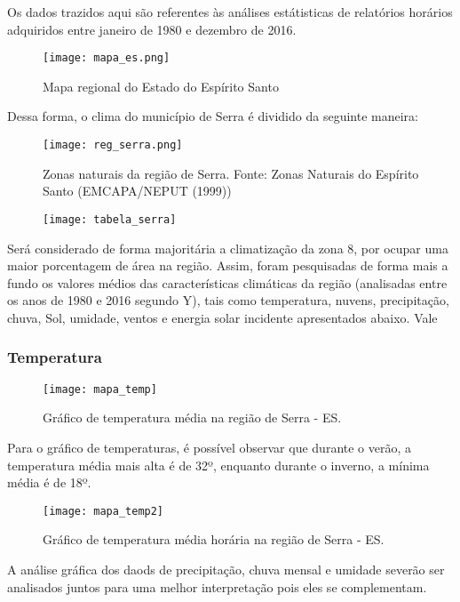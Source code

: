Os dados trazidos aqui são referentes às análises estátisticas de relatórios horários adquiridos entre janeiro de 1980 e dezembro de 2016. 


\begin{figure}[H]
	\texttt{[image: mapa\_es.png]}
	\centering
	\caption{Mapa regional do Estado do Espírito Santo}
	\label{mapa_es}
	
\end{figure}

Dessa forma, o clima do município de Serra é dividido da seguinte maneira:

\begin{figure}[!htb]
	\texttt{[image: reg\_serra.png]}
	\centering
	\caption{Zonas naturais da região de Serra. Fonte: Zonas Naturais do Espírito Santo (EMCAPA/NEPUT (1999))}
	\label{regiao_serra}
\end{figure}

\begin{figure}
	\texttt{[image: tabela\_serra]}
	\centering
\end{figure}

Será considerado de forma majoritária a climatização da zona 8, por ocupar uma maior porcentagem de área na região.
Assim, foram pesquisadas de forma mais a fundo os valores médios das características climáticas da região (analisadas entre os anos de 1980 e 2016 segundo Y), tais como temperatura, nuvens, precipitação, chuva, Sol, umidade, ventos e energia solar incidente apresentados abaixo. Vale  

\subsubsection{Temperatura}

\begin{figure}[H]
	\texttt{[image: mapa\_temp]}
	\centering
	\caption{Gráfico de temperatura média na região de Serra - ES.}
\end{figure}

Para o gráfico de temperaturas, é possível observar que durante o verão, a temperatura média mais alta é de 32º, enquanto durante o inverno, a mínima média é de 18º. 

\begin{figure}[H]
	\texttt{[image: mapa\_temp2]}
	\centering
	\caption{Gráfico de temperatura média horária na região de Serra - ES.}
\end{figure}

A análise gráfica dos daods de precipitação, chuva mensal e umidade severão ser analisados juntos para uma melhor interpretação pois eles se complementam.


